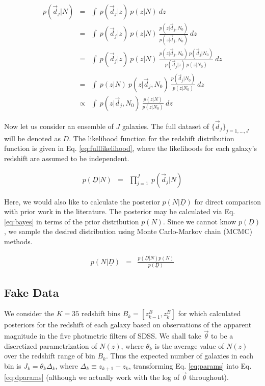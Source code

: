 \documentclass[12pt, onecolumn]{emulateapj}
\newcommand{\textul}{\underline}
\begin{document}
\begin{eqnarray}
\label{eq:likelihood}
p(\vec{d}_{j}|N) &=& \int\ p(\vec{d}_{j}|z)\ p(z|N)\ dz\\
&=& \int\ p(\vec{d}_{j}|z)\ p(z|N)\ \frac{p(z|\vec{d}_{j},N_{0})}{p(z|\vec{d}_{j},N_{0})}\ dz\nonumber\\
&=&  \int\ p(\vec{d}_{j}|z)\ p(z|N)\ \frac{p(z|\vec{d}_{j},N_{0})\ p(\vec{d}_{j}|N_{0})}{p(\vec{d}_{j}|z)\ p(z|N_{0})}\ dz\nonumber\\
\label{eq:posterior}
&=& \int\ p(z|N)\ p(z|\vec{d}_{j},N_{0})\ \frac{p(\vec{d}_{j}|N_{0})}{p(z|N_{0})}\ dz\nonumber\\
&\propto& \int\ p(z|\vec{d}_{j},N_{0})\ \frac{p(z|N)}{p(z|N_{0})}\ dz
\end{eqnarray}

Now let us consider an ensemble of $J$ galaxies.  The full dataset of $\{\vec{d}_{j}\}_{j=1,\dots,J}$ will be denoted as $\textul{D}$.  The likelihood function for the redshift distribution function is given in Eq. \ref{eq:fulllikelihood}, where the likelihoods for each galaxy's redshift are assumed to be independent.  

\begin{eqnarray}
\label{eq:fulllikelihood}
p(\textul{D}|N) &=& \prod_{j=1}^{J}\ p(\vec{d}_{j}|N)
\end{eqnarray}

Here, we would also like to calculate the posterior $p(N|\textul{D})$ for direct comparison with prior work in the literature.  The posterior may be calculated via Eq. \ref{eq:bayes} in terms of the prior distribution $p(N)$.  Since we cannot know $p(\textul{D})$, we sample the desired distribution using Monte Carlo-Markov chain (MCMC) methods.  

\begin{eqnarray}
\label{eq:bayes}
p(N|\textul{D}) &=& \frac{p(\textul{D}|N)p(N)}{p(\textul{D})}
\end{eqnarray}

\subsection{Fake Data}
\label{sec:fake}

We consider the $K=35$ redshift bins $B_{k}=[z^{B}_{k-1},z^{B}_{k}]$ for which \citet{she11} calculated posteriors for the redshift of each galaxy based on observations of the apparent magnitude in the five photmetric filters of SDSS.  We shall take $\vec{\theta}$ to be a discretized parametrization of $N(z)$, where $\theta_{k}$ is the average value of $N(z)$ over the redshift range of bin $B_{k}$.   Thus the expected number of galaxies in each bin is $J_{k}=\theta_{k}\Delta_{k}$, where $\Delta_{k}\equiv z_{k+1}-z_{k}$, transforming Eq. \ref{eq:params} into Eq. \ref{eq:dparams} (although we actually work with the log of $\vec{\theta}$ throughout).  
\end{document}
